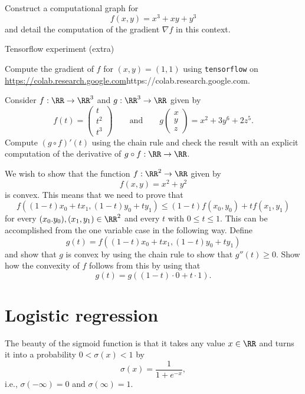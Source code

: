 \documentclass{article}
\begin{document}
\beginshex
Construct a computational graph for
$$
f(x, y) = x^3 + x y + y^3
$$
and detail the computation of the gradient $\nabla f$ in this context.

\begin{hideinbutton}{Tensorflow experiment (extra)}

  Compute the
gradient of $f$ for $(x, y) = (1, 1)$ using \texttt{tensorflow} on \url{https://colab.research.google.com}{https://colab.research.google.com}.
\end{hideinbutton}
\endshex




\beginshex
Consider $f: \RR\rightarrow \RR^3$ and $g:\RR^3\rightarrow \RR$
  given by
  \begin{equation*}
    f(t) =
     \begin{pmatrix}
       t\\ t^2\\ t^3
     \end{pmatrix}\qquad \text{and}\qquad g
    \begin{pmatrix}
       x\\ y\\ z
     \end{pmatrix} = x^2 + 3 y^6 + 2 z^5.
  \end{equation*}
  Compute $(g\circ f)'(t)$ using the chain rule and check the result
  with an explicit computation of the derivative of $g\circ f:
  \RR\rightarrow \RR$.
\endshex


\beginshex
We wish to show that the function $f: \RR^2 \rightarrow \RR$ given by
$$
f(x, y) = x^2 + y^2
$$
is convex. This means that we need to prove that
$$
f((1-t)x_0 + t x_1, (1-t) y_0 + t y_1) \leq (1-t) f(x_0, y_0) + t f(x_1, y_1)
$$
for every $(x_0. y_0), (x_1, y_1)\in \RR^2$ and every $t$ with $0\leq t\leq 1$.
This can be accomplished from the one variable case in the following way. Define
$$
g(t) = f((1-t)x_0 + t x_1, (1-t) y_0 + t y_1)
$$
and show that $g$ is convex by using the chain rule to show that $g''(t) \geq 0$. Show
how the convexity of $f$ follows from this by using that
$$
g(t) = g((1-t)\cdot 0 + t\cdot 1).
$$
\endshex

\section{Logistic regression}

The beauty of the sigmoid function is that it takes any value $x\in \RR$ and turns it into
a probability $0< \sigma(x) < 1$ by
$$
\sigma(x) =  \frac{1}{1 + e^{-x}},
$$
i.e., $\sigma(-\infty) = 0$ and $\sigma(\infty) = 1$.
\end{document}
